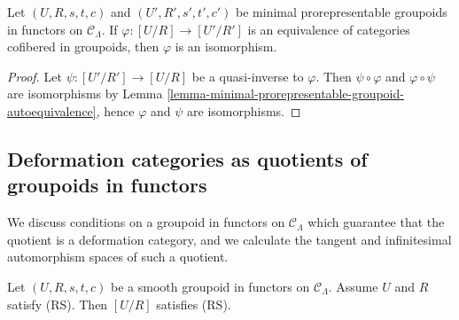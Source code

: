\begin{lemma}
\label{lemma-minimal-prorepresentable-groupoid-equivalence}
Let $(U,R,s,t,c)$ and $(U',R',s',t',c')$ be minimal prorepresentable groupoids 
in functors on $\mathcal{C}_\Lambda$.  If $\varphi: [U/R] \to [U'/R']$ 
is an equivalence of categories cofibered in groupoids, then $\varphi$ is an 
isomorphism. 
\end{lemma}

\begin{proof}
Let $\psi: [U'/R'] \to [U/R]$ be a quasi-inverse to $\varphi$.  Then 
$\psi \circ \varphi$ and $\varphi \circ \psi$ are isomorphisms by Lemma 
\ref{lemma-minimal-prorepresentable-groupoid-autoequivalence}, hence $\varphi$ 
and $\psi$ are isomorphisms.
\end{proof}

\subsection{Deformation categories as quotients of groupoids in functors}
\label{subsection-deformation-categories-as-quotients}

\noindent
We discuss conditions on a groupoid in functors on $\mathcal{C}_\Lambda$ which 
guarantee that the quotient is a deformation category, and we calculate the 
tangent and infinitesimal automorphism spaces of such a quotient.

\begin{lemma}
\label{lemma-smooth-RS-groupoid-in-functors-quotient}
Let $(U, R, s,t,c)$ be a smooth groupoid in functors on $\mathcal{C}_\Lambda$. 
Assume $U$ and $R$ satisfy (RS). Then $[U/R]$ satisfies (RS).
\end{lemma}

